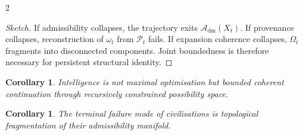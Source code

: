 \documentclass[10pt,a4paper]{article}
\theoremstyle{plain}
\newtheorem{corollary}[theorem]{Corollary}
\theoremstyle{remark}
\newcommand{\Pp}{\mathcal{P}}
\newcommand{\Adm}{\mathcal{A}_{\mathrm{dm}}}
\begin{document}
\begin{multicols}{2}
\begin{proof}[Sketch]
If admissibility collapses, the trajectory exits $\Adm(X_t)$.
If provenance collapses, reconstruction of $\omega_t$ from $\Pp_t$ fails.
If expansion coherence collapses, $\Omega_t$ fragments into disconnected
components. Joint boundedness is therefore necessary for persistent
structural identity.
\end{proof}

\begin{corollary}
Intelligence is not maximal optimisation but bounded coherent continuation
through recursively constrained possibility space.
\end{corollary}

\begin{corollary}
The terminal failure mode of civilisations is topological fragmentation of
their admissibility manifold.
\end{corollary}

\end{multicols}
\end{document}
